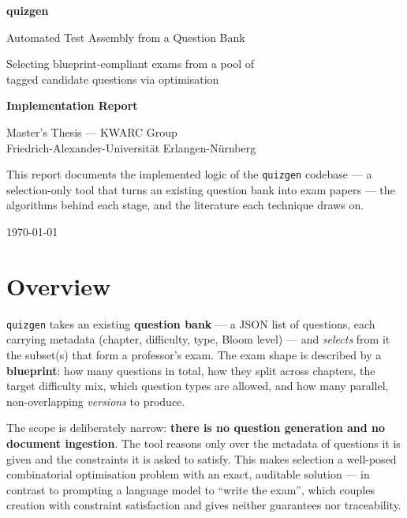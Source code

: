\documentclass[11pt,a4paper]{article}
\newcommand{\code}[1]{\texttt{\small #1}}
\begin{document}
\begin{titlepage}
\centering
\vspace*{2.2cm}
{\Huge\bfseries quizgen\par}
\vspace{6mm}
{\LARGE Automated Test Assembly from a Question Bank\par}
\vspace{3mm}
{\large Selecting blueprint-compliant exams from a pool of\\
tagged candidate questions via optimisation\par}
\vspace{1.4cm}
{\large\bfseries Implementation Report\par}
\vspace{4mm}
{\normalsize Master's Thesis --- KWARC Group\\
Friedrich-Alexander-Universit\"at Erlangen-N\"urnberg\par}
\vfill
{\small This report documents the implemented logic of the \code{quizgen}
codebase --- a selection-only tool that turns an existing question bank into
exam papers --- the algorithms behind each stage, and the literature each
technique draws on.\par}
\vspace{8mm}
{\small\today\par}
\end{titlepage}

\tableofcontents
\newpage

\section{Overview}
\label{sec:overview}

\code{quizgen} takes an existing \textbf{question bank} --- a JSON list of
questions, each carrying metadata (chapter, difficulty, type, Bloom level) ---
and \emph{selects} from it the subset(s) that form a professor's exam. The
exam shape is described by a \textbf{blueprint}: how many questions in total,
how they split across chapters, the target difficulty mix, which question types
are allowed, and how many parallel, non-overlapping \emph{versions} to produce.

The scope is deliberately narrow: \textbf{there is no question generation and
no document ingestion}. The tool reasons only over the metadata of questions
it is given and the constraints it is asked to satisfy. This makes selection a
well-posed combinatorial optimisation problem with an exact, auditable
solution --- in contrast to prompting a language model to ``write the exam'',
which couples creation with constraint satisfaction and gives neither
guarantees nor traceability.
\end{document}
